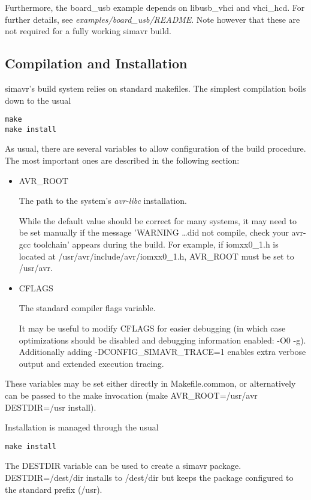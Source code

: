 Furthermore, the board\_usb example depends on libusb\_vhci and vhci\_hcd. For
further details, see \emph{examples/board\_usb/README}. Note however that these
are not required for a fully working simavr build.

\subsection{Compilation and Installation}

simavr's build system relies on standard makefiles. The simplest compilation
boils down to the usual

\begin{verbatim}
make
make install
\end{verbatim}

As usual, there are several variables to allow configuration of the build
procedure. The most important ones are described in the following section:

\begin{itemize}
\item AVR\_ROOT

The path to the system's \emph{avr-libc} installation.

While the default value
should be correct for many systems, it may need to be set manually if the
message 'WARNING \ldots did not compile, check your avr-gcc
toolchain' appears during the build. For example, if iomxx0\_1.h is located at
/usr/avr/include/avr/iomxx0\_1.h, AVR\_ROOT must be set to /usr/avr.

\item CFLAGS

The standard compiler flags variable.

It may be useful to modify CFLAGS for easier debugging (in which case
optimizations should be disabled and debugging information enabled: -O0 -g).
Additionally adding -DCONFIG\_SIMAVR\_TRACE=1 enables extra verbose output and
extended execution tracing.
\end{itemize}

These variables may be set either directly in Makefile.common, or alternatively
can be passed to the make invocation (make AVR\_ROOT=/usr/avr DESTDIR=/usr
install).

Installation is managed through the usual
\begin{verbatim}
make install                                           
\end{verbatim}

The DESTDIR variable can be used to create a simavr package. DESTDIR=/dest/dir
installs to /dest/dir but keeps the package configured to the standard prefix
(/usr).

